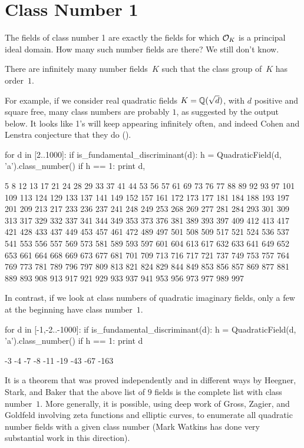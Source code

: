 \section{Class Number 1}\label{sec:cn1}
The fields of class number 1 are exactly the fields for
which $\mathcal{O}_K$ is a principal ideal domain.  How many such
number fields are there?   We still don't know.
\begin{conjecture}
  There are infinitely many number fields~$K$ such that the class
  group of~$K$ has order~$1$.
\end{conjecture}
For example, if we consider real quadratic fields $K=\mathbb{Q}(\sqrt{d})$,
with $d$ positive and square free, many class numbers are probably $1$,
as suggested by the \sage{} output below.
It looks like 1's will keep appearing infinitely often, and indeed
Cohen and Lenstra conjecture that they do (\cite{cohen-lenstra:heuristics}).
\begin{sagecode}
\begin{sagecell}
for d in [2..1000]:
    if is_fundamental_discriminant(d):
        h = QuadraticField(d, 'a').class_number()
        if h == 1:
            print d,
\end{sagecell}
\begin{sageout}
5 8 12 13 17 21 24 28 29 33 37 41 44 53 56 57 61 69
73 76 77 88 89 92 93 97 101 109 113 124 129 133 137
141 149 152 157 161 172 173 177 181 184 188 193 197
201 209 213 217 233 236 237 241 248 249 253 268 269
277 281 284 293 301 309 313 317 329 332 337 341 344
349 353 373 376 381 389 393 397 409 412 413 417 421
428 433 437 449 453 457 461 472 489 497 501 508 509
517 521 524 536 537 541 553 556 557 569 573 581 589
593 597 601 604 613 617 632 633 641 649 652 653 661
664 668 669 673 677 681 701 709 713 716 717 721 737
749 753 757 764 769 773 781 789 796 797 809 813 821
824 829 844 849 853 856 857 869 877 881 889 893 908
913 917 921 929 933 937 941 953 956 973 977 989 997
\end{sageout}
\end{sagecode}
In contrast, if we look at class numbers of quadratic imaginary fields,
only a few at the beginning have class number~$1$.
\begin{sagecode}
\begin{sagecell}
for d in [-1,-2..-1000]:
    if is_fundamental_discriminant(d):
        h = QuadraticField(d, 'a').class_number()
        if h == 1:
            print d
\end{sagecell}
\begin{sageout}
-3 -4 -7 -8 -11 -19 -43 -67 -163
\end{sageout}
\end{sagecode}
It is a theorem that was proved independently and in different ways by
Heegner, Stark, and Baker that the above list of $9$ fields is the
complete list with class number~$1$.  More generally, it is possible,
using deep work of Gross, Zagier, and Goldfeld involving zeta
functions and elliptic curves, to enumerate all quadratic number
fields with a given class number (Mark Watkins has done very
substantial work in this direction).

